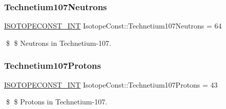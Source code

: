 \subsubsection{\texorpdfstring{Technetium107\+Neutrons}{Technetium107Neutrons}}
{\footnotesize\ttfamily \mbox{\hyperlink{group___isotope_const-_macros_ga5f18360b3e99483a35c32d789e62621c}{I\+S\+O\+T\+O\+P\+E\+C\+O\+N\+S\+T\+\_\+\+I\+NT}} Isotope\+Const\+::\+Technetium107\+Neutrons = 64}

\$ \$ Neutrons in Technetium-\/107. \mbox{\label{group___isotope_const-_technetium-_tc107_gac34b66df45801ca155073ad9fe09c7e6}} 
\subsubsection{\texorpdfstring{Technetium107\+Protons}{Technetium107Protons}}
{\footnotesize\ttfamily \mbox{\hyperlink{group___isotope_const-_macros_ga5f18360b3e99483a35c32d789e62621c}{I\+S\+O\+T\+O\+P\+E\+C\+O\+N\+S\+T\+\_\+\+I\+NT}} Isotope\+Const\+::\+Technetium107\+Protons = 43}

\$ \$ Protons in Technetium-\/107. 